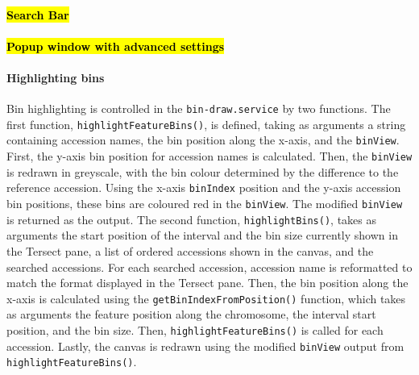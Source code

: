 \documentclass[12pt]{article}
\begin{document}
\paragraph{\hl{Search Bar}}
\paragraph{\hl{Popup window with advanced settings }}
\paragraph{Highlighting bins}
Bin highlighting is controlled in the \verb+bin-draw.service+ by two functions. The first function, \verb+highlightFeatureBins()+, is defined, taking as arguments a string containing accession names, the bin position along the x-axis, and the \verb+binView+. First, the y-axis bin position for accession names is calculated. Then, the \verb+binView+ is redrawn in greyscale, with the bin colour determined by the difference to the reference accession. Using the x-axis \verb+binIndex+ position and the y-axis accession bin positions, these bins are coloured red in the \verb+binView+. The modified \verb+binView+ is returned as the output. The second function, \verb+highlightBins()+, takes as arguments the start position of the interval and the bin size currently shown in the Tersect pane, a list of ordered accessions shown in the canvas, and the searched accessions. For each searched accession, accession name is reformatted to match the format displayed in the Tersect pane. Then, the bin position along the x-axis is calculated using the \verb+getBinIndexFromPosition()+ function, which takes as arguments the feature position along the chromosome, the interval start position, and the bin size. Then, \verb+highlightFeatureBins()+ is called for each accession. Lastly, the canvas is redrawn using the modified \verb+binView+ output from \verb+highlightFeatureBins()+. 
\end{document}
